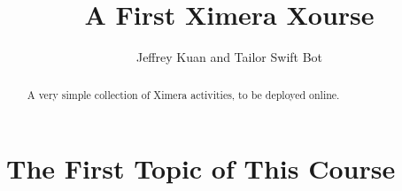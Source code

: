 \documentclass{xourse}
\author{Jeffrey Kuan and Tailor Swift Bot}
\title{A First Ximera Xourse}
\begin{document}
\begin{abstract}
    A very simple collection of Ximera activities, 
    to be deployed online.
\end{abstract}
\maketitle

\part{The First Topic of This Course}
\chapterstyle
{}
\end{document}
